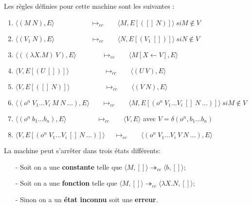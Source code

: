 \documentclass[10pt,a4paper]{report}
\begin{document}
	
	Les règles définies pour cette machine sont les suivantes :
	\begin{enumerate}
		
		\item $\langle(M~N),E\rangle~~~~~~~~~~~~~~~~~~~~~~~~\longmapsto_{cc}~~~~~~~~\langle M,E[([]~N)]\rangle~si M \notin V$
		
		\item $\langle(V_{1}~N),E\rangle~~~~~~~~~~~~~~~~~~~~~~~~\longmapsto_{cc}~~~~~~~~\langle N,E[(V_{1}~[])]\rangle~si N \notin V$
		
		\item $\langle((\lambda X.M)~V),E\rangle~~~~~~~~~~~~~~~~~\longmapsto_{cc}~~~~~~~~\langle M[X\longleftarrow V],E\rangle$
		
		\item $\langle V,E[(U~[])]\rangle~~~~~~~~~~~~~~~~~~~~~~~\longmapsto_{cc}~~~~~~~~\langle(U~V),E\rangle$
		
		\item $\langle V,E[([]~N)]\rangle~~~~~~~~~~~~~~~~~~~~~~~\longmapsto_{cc}~~~~~~~~\langle(V~N),E\rangle$ 
		
		\item $\langle(o^{n}~V_{1}...V_{i}~M~N~...),E\rangle~~~~~~~~\longmapsto_{cc}~~~~~~~~
		\langle M,E[(o^{n}~V_{1}...V_{i}~[]~N~...)]\rangle~ si M \notin V$
		
		\item $\langle(o^{n}~b_{1}...b_{n}),E\rangle~~~~~~~~~~~~~~~~~~~~\longmapsto_{cc}~~~~~~~~\langle V,E\rangle$ avec $V = \delta(o^{n},b_{1}...b_{n})$ 
		
		\item $\langle V,E[(o^{n}~V_{1}...V_{i}~[]~N~...)]\rangle ~~~~~~\longmapsto_{cc}~~~~~~~~\langle(o^{n}~V_{1}...V_{i}~V~N ~...),E\rangle$ 
	\end{enumerate}
	\bigbreak
	
	
	La machine peut s'arrêter dans trois états différents:
	\begin{itemize}
		\item[-] Soit on a une \textbf{constante} telle que $\langle M,[]\rangle \twoheadrightarrow_{cc} \langle b,[]\rangle$;
		\item[-] Soit on a une \textbf{fonction} telle que $\langle M,[]\rangle \twoheadrightarrow_{cc} \langle\lambda X.N,[]\rangle$;
		\item[-] Sinon on a un \textbf{état inconnu} soit une \textbf{erreur}.
	\end{itemize}
	\bigbreak
	
\end{document}

